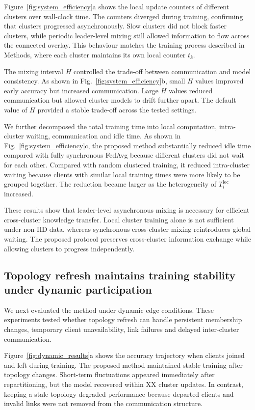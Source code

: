 \documentclass[pdflatex,sn-mathphys-num]{sn-jnl}
\begin{document}
Figure~\ref{fig:system_efficiency}a shows the local update counters of different clusters over wall-clock time. The counters diverged during training, confirming that clusters progressed asynchronously. Slow clusters did not block faster clusters, while periodic leader-level mixing still allowed information to flow across the connected overlay. This behaviour matches the training process described in Methods, where each cluster maintains its own local counter \(t_k\).

The mixing interval \(H\) controlled the trade-off between communication and model consistency. As shown in Fig.~\ref{fig:system_efficiency}b, small \(H\) values improved early accuracy but increased communication. Large \(H\) values reduced communication but allowed cluster models to drift further apart. The default value of \(H\) provided a stable trade-off across the tested settings.

We further decomposed the total training time into local computation, intra-cluster waiting, communication and idle time. As shown in Fig.~\ref{fig:system_efficiency}c, the proposed method substantially reduced idle time compared with fully synchronous FedAvg because different clusters did not wait for each other. Compared with random clustered training, it reduced intra-cluster waiting because clients with similar local training times were more likely to be grouped together. The reduction became larger as the heterogeneity of \(T_i^{\mathrm{loc}}\) increased.

These results show that leader-level asynchronous mixing is necessary for efficient cross-cluster knowledge transfer. Local cluster training alone is not sufficient under non-IID data, whereas synchronous cross-cluster mixing reintroduces global waiting. The proposed protocol preserves cross-cluster information exchange while allowing clusters to progress independently.

\subsection{Topology refresh maintains training stability under dynamic participation}
\label{subsec:dynamic_results}

We next evaluated the method under dynamic edge conditions. These experiments tested whether topology refresh can handle persistent membership changes, temporary client unavailability, link failures and delayed inter-cluster communication.

Figure~\ref{fig:dynamic_results}a shows the accuracy trajectory when clients joined and left during training. The proposed method maintained stable training after topology changes. Short-term fluctuations appeared immediately after repartitioning, but the model recovered within XX cluster updates. In contrast, keeping a stale topology degraded performance because departed clients and invalid links were not removed from the communication structure.
\end{document}
